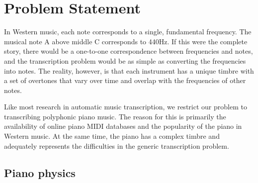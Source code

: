 \documentclass[5p]{elsarticle}
\begin{document}
















\section{Problem Statement}

In Western music, each note corresponds to a single, fundamental frequency. The musical note A above middle C corresponds to 440Hz. If this were the complete story, there would be a one-to-one correspondence between frequencies and notes, and the transcription problem would be as simple as converting the frequencies into notes. The reality, however, is that each instrument has a unique timbre with a set of overtones that vary over time and overlap with the frequencies of other notes.

Like most research in automatic music transcription, we restrict our problem to transcribing polyphonic piano music. The reason for this is primarily the availability of online piano MIDI databases and the popularity of the piano in Western music. At the same time, the piano has a complex timbre and adequately represents the difficulties in the generic transcription problem.

\subsection{Piano physics}
\end{document}
